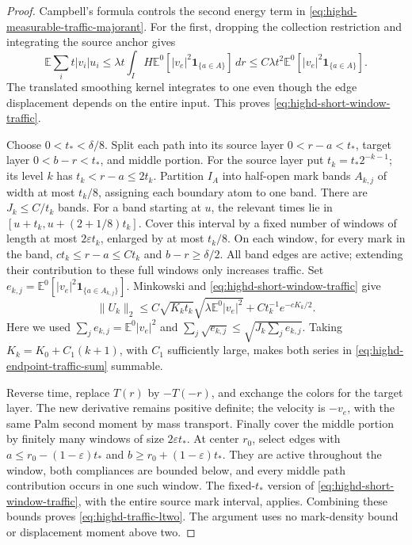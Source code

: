 \documentclass[11pt,reqno]{amsart}
\theoremstyle{definition}
\theoremstyle{remark}
\numberwithin{equation}{section}
\newcommand{\E}{\mathbb E}
\begin{document}
\begin{proof}
Campbell's formula controls the second energy term in
\eqref{eq:highd-measurable-traffic-majorant}. For the first, dropping
the collection restriction and integrating the source anchor gives
\[
 \E\sum_i t|v_i|u_i
 \le\lambda t\int_I H\E^0[|v_e|^2\mathbf1_{\{a\in A\}}]\,dr
 \le C\lambda t^2\E^0[|v_e|^2\mathbf1_{\{a\in A\}}].
\]
The translated smoothing kernel integrates to one even though the
edge displacement depends on the entire input. This proves
\eqref{eq:highd-short-window-traffic}.

Choose \(0<t_*<\delta/8\). Split each path into its source layer
\(0<r-a<t_*\), target layer \(0<b-r<t_*\), and middle portion.
For the source layer put \(t_k=t_*2^{-k-1}\); its level \(k\) has
\(t_k<r-a\le2t_k\). Partition \(I_A\) into half-open mark bands
\(A_{k,j}\) of width at most \(t_k/8\), assigning each boundary atom
to one band. There are \(J_k\le C/t_k\) bands. For a band starting
at \(u\), the relevant times lie in
\([u+t_k,u+(2+1/8)t_k]\). Cover this interval by a fixed number of
windows of length at most \(2\varepsilon t_k\), enlarged by at most
\(t_k/8\). On each window, for every mark in the band,
\(ct_k\le r-a\le Ct_k\) and \(b-r\ge\delta/2\).
All band edges are active; extending their contribution to these full
windows only increases traffic. Set
\(e_{k,j}=\E^0[|v_e|^2\mathbf1_{\{a\in A_{k,j}\}}]\).
Minkowski and \eqref{eq:highd-short-window-traffic} give
\begin{equation}
\label{eq:highd-endpoint-traffic-sum}
 \|U_k\|_2
 \le C\sqrt{K_kt_k}\sqrt{\lambda\E^0|v_e|^2}
       +Ct_k^{-1}e^{-cK_k/2}.
\end{equation}
Here we used \(\sum_j e_{k,j}=\E^0|v_e|^2\) and
\(\sum_j\sqrt{e_{k,j}}\le\sqrt{J_k\sum_j e_{k,j}}\).
Taking \(K_k=K_0+C_1(k+1)\), with \(C_1\) sufficiently large,
makes both series in \eqref{eq:highd-endpoint-traffic-sum} summable.

Reverse time, replace \(T(r)\) by \(-T(-r)\), and exchange the
colors for the target layer. The new derivative remains positive
definite; the velocity is \(-v_e\), with the same Palm second moment
by mass transport. Finally cover the middle portion by finitely many
windows of size \(2\varepsilon t_*\). At center \(r_0\), select
edges with \(a\le r_0-(1-\varepsilon)t_*\) and
\(b\ge r_0+(1-\varepsilon)t_*\). They are active throughout the
window, both compliances are bounded below, and every middle path
contribution occurs in one such window. The fixed-\(t_*\) version of
\eqref{eq:highd-short-window-traffic}, with the entire source mark
interval, applies. Combining these bounds proves
\eqref{eq:highd-traffic-ltwo}. The argument uses no mark-density bound
or displacement moment above two.
\end{proof}
\end{document}
